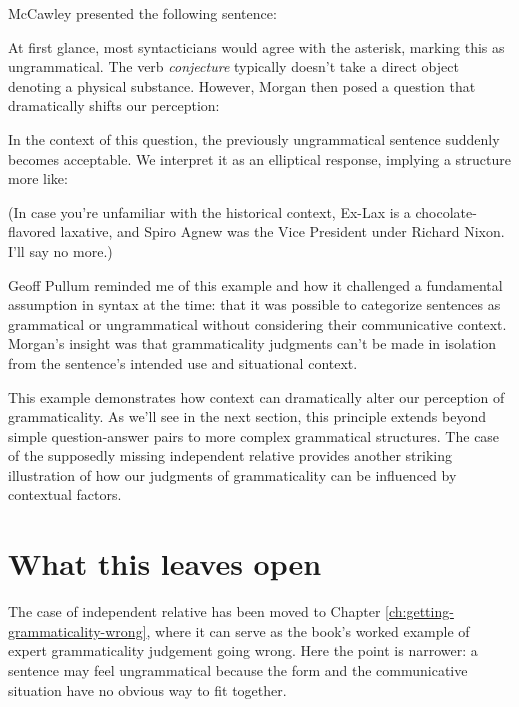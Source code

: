 McCawley presented the following sentence:

\label{ex:spiro-ex-lax}\z

At first glance, most syntacticians would agree with the asterisk, marking this as ungrammatical. The verb \textit{conjecture} typically doesn't take a direct object denoting a physical substance. However, Morgan then posed a question that dramatically shifts our perception:

\label{ex:pat-nixon-cakes}\z

In the context of this question, the previously ungrammatical sentence suddenly becomes acceptable. We interpret it as an elliptical response, implying a structure more like:

\label{ex:spiro-full}\z

(In case you're unfamiliar with the historical context, Ex-Lax is a chocolate-flavored laxative, and Spiro Agnew was the Vice President under Richard Nixon. I'll say no more.)

Geoff Pullum reminded me of this example and how it challenged a fundamental assumption in syntax at the time: that it was possible to categorize sentences as grammatical or ungrammatical without considering their communicative context. Morgan's insight was that grammaticality judgments can't be made in isolation from the sentence's intended use and situational context.

This example demonstrates how context can dramatically alter our perception of grammaticality. As we'll see in the next section, this principle extends beyond simple question-answer pairs to more complex grammatical structures. The case of the supposedly missing independent relative  provides another striking illustration of how our judgments of grammaticality can be influenced by contextual factors.

\section{What this leaves open}

The case of independent relative  has been moved to Chapter \ref{ch:getting-grammaticality-wrong}, where it can serve as the book's worked example of expert grammaticality judgement going wrong. Here the point is narrower: a sentence may feel ungrammatical because the form and the communicative situation have no obvious way to fit together.
